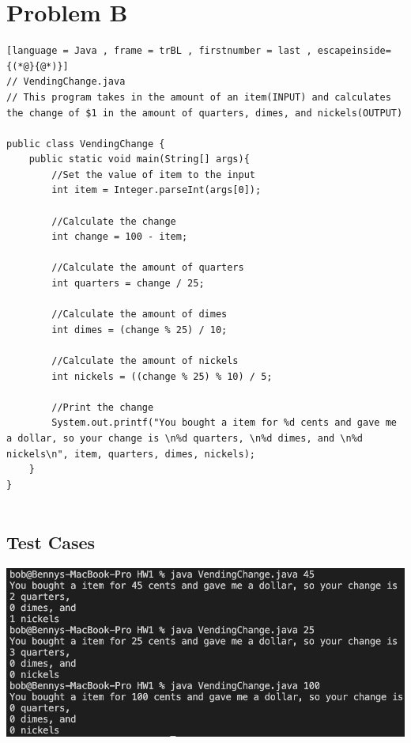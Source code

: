 \documentclass{article}
\begin{document}
\section{Problem B}

\begin{lstlisting}[language = Java , frame = trBL , firstnumber = last , escapeinside={(*@}{@*)}]
// VendingChange.java
// This program takes in the amount of an item(INPUT) and calculates the change of $1 in the amount of quarters, dimes, and nickels(OUTPUT)

public class VendingChange {
    public static void main(String[] args){
        //Set the value of item to the input
        int item = Integer.parseInt(args[0]); 

        //Calculate the change
        int change = 100 - item; 

        //Calculate the amount of quarters
        int quarters = change / 25; 

        //Calculate the amount of dimes
        int dimes = (change % 25) / 10; 

        //Calculate the amount of nickels
        int nickels = ((change % 25) % 10) / 5; 

        //Print the change
        System.out.printf("You bought a item for %d cents and gave me a dollar, so your change is \n%d quarters, \n%d dimes, and \n%d nickels\n", item, quarters, dimes, nickels); 
    }       
}
    
\end{lstlisting}

\subsection*{Test Cases}

\begin{center}
    \includegraphics*[scale = .65]{./images/q2test.png}
\end{center}
\end{document}
